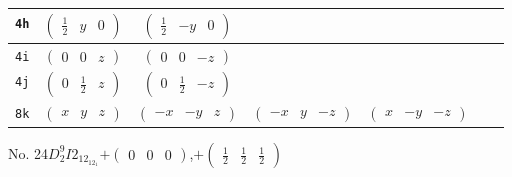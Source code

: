 \documentclass[fleqn,9pt,landscape]{jsarticle}
\begin{document}
\begin{center}
\begin{longtable}{ccccccc}
{\tt 4h} & $ \begin{pmatrix} \frac{1}{2} & y & 0 \end{pmatrix} $ & $ \begin{pmatrix} \frac{1}{2} & - y & 0 \end{pmatrix} $ & $  $ & $  $ \\ \hline
{\tt 4i} & $ \begin{pmatrix} 0 & 0 & z \end{pmatrix} $ & $ \begin{pmatrix} 0 & 0 & - z \end{pmatrix} $ & $  $ & $  $ \\ \hline
{\tt 4j} & $ \begin{pmatrix} 0 & \frac{1}{2} & z \end{pmatrix} $ & $ \begin{pmatrix} 0 & \frac{1}{2} & - z \end{pmatrix} $ & $  $ & $  $ \\ \hline
{\tt 8k} & $ \begin{pmatrix} x & y & z \end{pmatrix} $ & $ \begin{pmatrix} - x & - y & z \end{pmatrix} $ & $ \begin{pmatrix} - x & y & - z \end{pmatrix} $ & $ \begin{pmatrix} x & - y & - z \end{pmatrix} $ \\
\end{longtable}
\end{center}
\newpage
No. 24\quad$D_{2}^{9}$\quad$I2_12_12_1$\quad[ orthorhombic ]\quad$+\begin{pmatrix} 0 & 0 & 0 \end{pmatrix}$,\quad $+\begin{pmatrix} \frac{1}{2} & \frac{1}{2} & \frac{1}{2} \end{pmatrix}$
\end{document}

